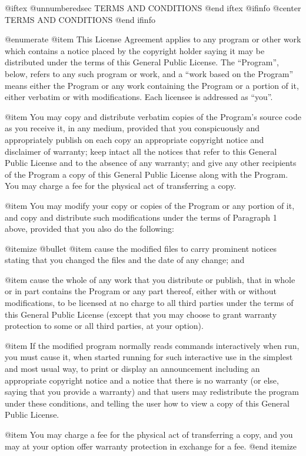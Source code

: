 @iftex
@unnumberedsec TERMS AND CONDITIONS
@end iftex
@ifinfo
@center TERMS AND CONDITIONS
@end ifinfo

@enumerate
@item
This License Agreement applies to any program or other work which
contains a notice placed by the copyright holder saying it may be
distributed under the terms of this General Public License.  The
``Program'', below, refers to any such program or work, and a ``work based
on the Program'' means either the Program or any work containing the
Program or a portion of it, either verbatim or with modifications.  Each
licensee is addressed as ``you''.

@item
You may copy and distribute verbatim copies of the Program's source
code as you receive it, in any medium, provided that you conspicuously and
appropriately publish on each copy an appropriate copyright notice and
disclaimer of warranty; keep intact all the notices that refer to this
General Public License and to the absence of any warranty; and give any
other recipients of the Program a copy of this General Public License
along with the Program.  You may charge a fee for the physical act of
transferring a copy.

@item
You may modify your copy or copies of the Program or any portion of
it, and copy and distribute such modifications under the terms of Paragraph
1 above, provided that you also do the following:

@itemize @bullet
@item
cause the modified files to carry prominent notices stating that
you changed the files and the date of any change; and

@item
cause the whole of any work that you distribute or publish, that
in whole or in part contains the Program or any part thereof, either
with or without modifications, to be licensed at no charge to all
third parties under the terms of this General Public License (except
that you may choose to grant warranty protection to some or all
third parties, at your option).

@item
If the modified program normally reads commands interactively when
run, you must cause it, when started running for such interactive use
in the simplest and most usual way, to print or display an
announcement including an appropriate copyright notice and a notice
that there is no warranty (or else, saying that you provide a
warranty) and that users may redistribute the program under these
conditions, and telling the user how to view a copy of this General
Public License.

@item
You may charge a fee for the physical act of transferring a
copy, and you may at your option offer warranty protection in
exchange for a fee.
@end itemize


